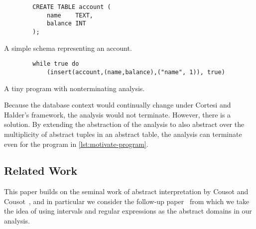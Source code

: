 \begin{listing}
    \begin{verbatim}
        CREATE TABLE account (
            name    TEXT,
            balance INT
        );
    \end{verbatim}
    \caption{A simple schema representing an account.}
    \label{lst:motivate-sql}
\end{listing}


\begin{listing}
    \begin{verbatim}
        while true do
            (insert(account,(name,balance),("name", 1)), true)
    \end{verbatim}
    \caption{A tiny program with nonterminating analysis.}
    \label{lst:motivate-program}
\end{listing}

Because the database context would continually change under Cortesi and Halder's framework, the analysis would not terminate.
However, there is a solution.
By extending the abstraction of the analysis to also abstract over the multiplicity of abstract tuples in an abstract table, the analysis can terminate even for the program in \autoref{lst:motivate-program}.



\subsection{Related Work}\label{subsec:related-work}
This paper builds on the seminal work of abstract interpretation by Cousot and Cousot~\cite{cousot_abstract_1977}, and in particular we consider the follow-up paper~\cite{cousot_abstract_1996} from which we take the idea of using intervals and regular expressions as the abstract domains in our analysis.


